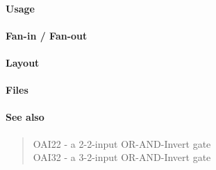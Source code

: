\paragraph{Usage}

\paragraph{Fan-in / Fan-out}

\paragraph{Layout}

\paragraph{Files}

\paragraph{See also}
\begin{quote}
    OAI22 - a 2-2-input OR-AND-Invert gate \\
    OAI32 - a 3-2-input OR-AND-Invert gate
\end{quote}

